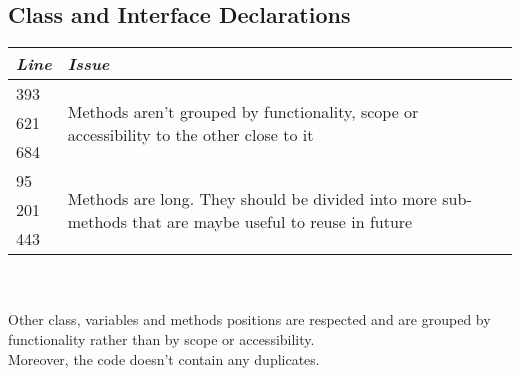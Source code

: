 \documentclass[11pt,a4paper]{report}
\begin{document}
\subsection{Class and Interface Declarations}
\begin{tabularx}{\textwidth}{|l|X|}
	\hline
	\textit{Line} & \textit{Issue}\\
	\hline
	\hline
	393 & \multirow{3}{\linewidth}{Methods aren't grouped by functionality, scope or accessibility to the other close to it}\\
	621 & \\
	684 & \\
	\hline
	95 & \multirow{3}{\linewidth}{Methods are long. They should be divided into more sub-methods that are maybe useful to reuse in future}\\
	201 & \\
	443 & \\
	\hline
\end{tabularx}\\
\\
Other class, variables and methods positions are respected and are grouped by functionality rather than by scope or accessibility.\\Moreover, the code doesn't contain any duplicates.
\end{document}
